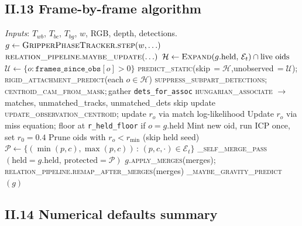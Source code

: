 \documentclass[11pt]{article}
\begin{document}
\subsection*{II.13 Frame-by-frame algorithm}

\begin{algorithm}[H]
\caption{One frame of the Bernoulli-EKF tracker (driver loop).}
\begin{algorithmic}[1]
\State \emph{Inputs}: $T_{wb}$, $T_{bc}$, $T_{bg}$, $w$, RGB, depth, detections.
\State $g \gets \textsc{GripperPhaseTracker}.\textsc{step}(w, \ldots)$
\State $\textsc{relation\_pipeline}.\textsc{maybe\_update}(\ldots)$
\State $\mathcal{H} \gets \textsc{Expand}(g.\text{held},\,\mathcal{E}_t)\cap\text{live oids}$
\State $\mathcal{U} \gets \{o : \texttt{frames\_since\_obs}[o] > 0\}$ 
\State \textsc{predict\_static}(skip\,$=\!\mathcal{H}$,\;unobserved\,$=\!\mathcal{U}$);\,\textsc{rigid\_attachment\_predict}(each $o\in\mathcal{H}$)
\State \textsc{suppress\_subpart\_detections};\,\textsc{centroid\_cam\_from\_mask};\,gather \texttt{dets\_for\_assoc}
\State \textsc{hungarian\_associate} $\to$ matches, unmatched\_tracks, unmatched\_dets
   skip update \EndIf
  \State \textsc{update\_observation\_centroid}; update $r_o$ via match log-likelihood
\EndFor
{}
  \State Update $r_o$ via miss equation; floor at \texttt{r\_held\_floor} if $o = g.\text{held}$
\EndFor
{}
    \State Mint new oid, run ICP once, set $r_0=0.4$
  \EndIf
\EndFor
\State Prune oids with $r_o < r_{\min}$ (skip held seed)
\State $\mathcal{P} \gets \{(\min(p,c),\max(p,c))\,:\,(p,c,\cdot)\in\mathcal{E}_t\}$
\State \textsc{\_self\_merge\_pass}$(\text{held}=g.\text{held},\,\text{protected}=\mathcal{P})$
\State $g$.\textsc{apply\_merges}(merges); \textsc{relation\_pipeline}.\textsc{remap\_after\_merges}(merges)
\State \textsc{\_maybe\_gravity\_predict}$(g)$ 
\end{algorithmic}
\end{algorithm}

\subsection*{II.14 Numerical defaults summary}
\end{document}
